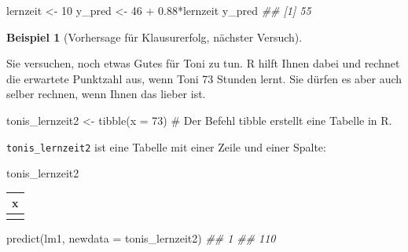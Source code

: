\documentclass[
  letterpaper,
]{scrbook}
\newenvironment{Shaded}{\begin{snugshade}}{\end{snugshade}}
\newcommand{\AttributeTok}[1]{\textcolor[rgb]{0.40,0.45,0.13}{#1}}
\newcommand{\CommentTok}[1]{\textcolor[rgb]{0.37,0.37,0.37}{#1}}
\newcommand{\DecValTok}[1]{\textcolor[rgb]{0.68,0.00,0.00}{#1}}
\newcommand{\DocumentationTok}[1]{\textcolor[rgb]{0.37,0.37,0.37}{\textit{#1}}}
\newcommand{\FloatTok}[1]{\textcolor[rgb]{0.68,0.00,0.00}{#1}}
\newcommand{\FunctionTok}[1]{\textcolor[rgb]{0.28,0.35,0.67}{#1}}
\newcommand{\NormalTok}[1]{\textcolor[rgb]{0.00,0.23,0.31}{#1}}
\newcommand{\OtherTok}[1]{\textcolor[rgb]{0.00,0.23,0.31}{#1}}
\newcommand{\SpecialCharTok}[1]{\textcolor[rgb]{0.37,0.37,0.37}{#1}}
\theoremstyle{definition}
\theoremstyle{definition}
\newtheorem{example}{Beispiel}[chapter]
\theoremstyle{definition}
\theoremstyle{remark}
\begin{document}
\begin{Shaded}
\begin{Highlighting}[]
\NormalTok{lernzeit }\OtherTok{\textless{}{-}} \DecValTok{10}
\NormalTok{y\_pred }\OtherTok{\textless{}{-}} \DecValTok{46} \SpecialCharTok{+} \FloatTok{0.88}\SpecialCharTok{*}\NormalTok{lernzeit}
\NormalTok{y\_pred}
\DocumentationTok{\#\# [1] 55}
\end{Highlighting}
\end{Shaded}

\begin{example}[Vorhersage für Klausurerfolg, nächster
Versuch]\protect\hypertarget{exm-noten6}{}\label{exm-noten6}

Sie versuchen, noch etwas Gutes für Toni zu tun. R hilft Ihnen dabei und
rechnet die erwartete Punktzahl aus, wenn Toni 73 Stunden lernt. Sie
dürfen es aber auch selber rechnen, wenn Ihnen das lieber ist.

\end{example}

\begin{Shaded}
\begin{Highlighting}[]
\NormalTok{tonis\_lernzeit2 }\OtherTok{\textless{}{-}} \FunctionTok{tibble}\NormalTok{(}\AttributeTok{x =} \DecValTok{73}\NormalTok{)  }\CommentTok{\# Der Befehl \textasciigrave{}tibble\textasciigrave{} erstellt eine Tabelle in R.}
\end{Highlighting}
\end{Shaded}

\texttt{tonis\_lernzeit2} ist eine Tabelle mit einer Zeile und einer
Spalte:

\begin{Shaded}
\begin{Highlighting}[]
\NormalTok{tonis\_lernzeit2}
\end{Highlighting}
\end{Shaded}

\begin{longtable}[]{@{}r@{}}
\toprule\noalign{}
x \\
\midrule\noalign{}
\endhead
\bottomrule\noalign{}
\endlastfoot
73 \\
\end{longtable}

\begin{Shaded}
\begin{Highlighting}[]
\FunctionTok{predict}\NormalTok{(lm1, }\AttributeTok{newdata =}\NormalTok{ tonis\_lernzeit2)}
\DocumentationTok{\#\#   1 }
\DocumentationTok{\#\# 110}
\end{Highlighting}
\end{Shaded}
\end{document}
